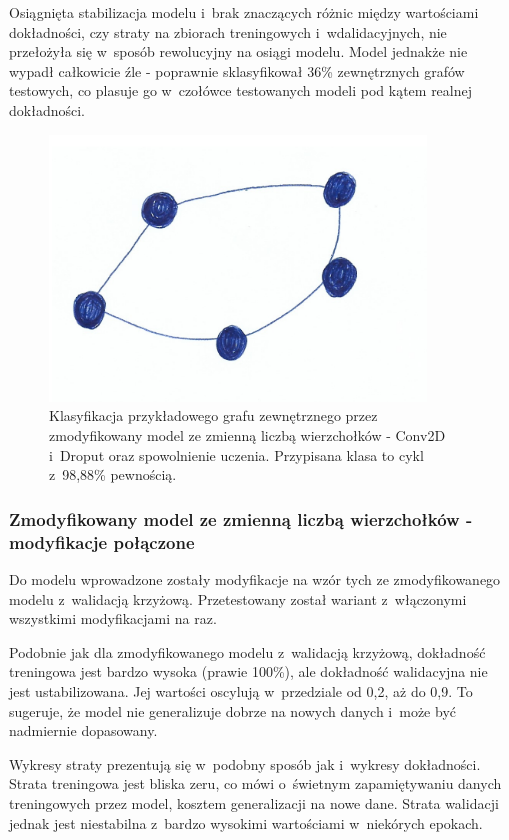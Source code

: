 Osiągnięta stabilizacja modelu i~brak znaczących różnic między wartościami dokładności,
czy straty na zbiorach treningowych i~wdalidacyjnych, nie przełożyła się w~sposób rewolucyjny na osiągi modelu.
Model jednakże nie wypadł całkowicie źle - poprawnie sklasyfikował 36\% zewnętrznych grafów testowych,
co plasuje go w~czołówce testowanych modeli pod kątem realnej dokładności.

\begin{figure}[ht]
	\centering
	\includegraphics[width=10cm]{../graph_classification/test_graphs/drawn/cycle-7.png}
	\caption{Klasyfikacja przykładowego grafu zewnętrznego przez zmodyfikowany model ze zmienną liczbą wierzchołków
		- Conv2D i~Droput oraz spowolnienie uczenia.
		Przypisana klasa to cykl z~98,88\% pewnością.}
	\label{Fig:tests-var-1d}
\end{figure}
\FloatBarrier

\subsubsection{Zmodyfikowany model ze zmienną liczbą wierzchołków - modyfikacje połączone}

Do modelu wprowadzone zostały modyfikacje na wzór tych ze zmodyfikowanego modelu z~walidacją krzyżową.
Przetestowany został wariant z~włączonymi wszystkimi modyfikacjami na raz.

Podobnie jak dla zmodyfikowanego modelu z~walidacją krzyżową, dokładność treningowa jest bardzo wysoka (prawie 100\%),
ale dokładność walidacyjna nie jest ustabilizowana. Jej wartości oscylują w~przedziale od 0,2, aż do 0,9.
To sugeruje, że model nie generalizuje dobrze na nowych danych i~może być nadmiernie dopasowany.

Wykresy straty prezentują się w~podobny sposób jak i~wykresy dokładności.
Strata treningowa jest bliska zeru, co mówi o~świetnym zapamiętywaniu danych treningowych przez model, kosztem generalizacji na nowe dane.
Strata walidacji jednak jest niestabilna z~bardzo wysokimi wartościami w~niekórych epokach.

